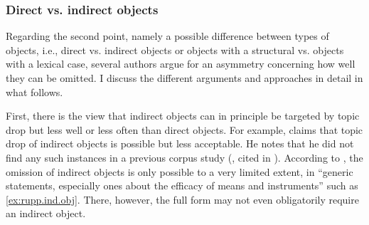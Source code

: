 \subsubsection{Direct vs. indirect objects}
Regarding the second point, namely a possible difference between types of objects, i.e., direct vs. indirect objects or objects with a structural vs. objects with a lexical case,   several authors argue for an asymmetry concerning how well they can be omitted.
I discuss the different arguments and approaches in detail in what follows.

First, there is the view that indirect objects can in principle be targeted by topic drop but less well or less often than direct objects.
For example, \citet[3]{schalowski2015} claims that topic drop of indirect objects is possible but less acceptable.
He notes that he did not find any such instances in a previous corpus  study (\cite{schalowski2009}, cited in \cite{schalowski2015}).
According to \citet{ruppenhofer2018}, the omission of indirect objects is only possible to a very limited extent, in ``generic statements, especially ones about the efficacy of means and instruments'' \citep[224, footnote 14]{ruppenhofer2018} such as \ref{ex:rupp.ind.obj}.
There, however, the full form may not even obligatorily require an indirect object.%
